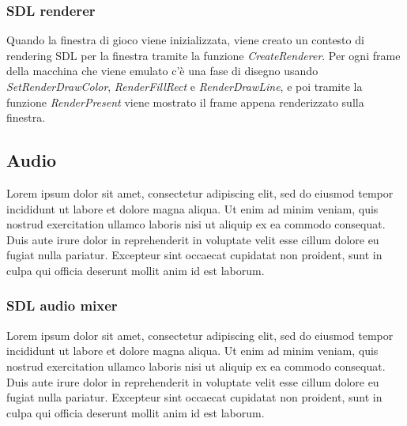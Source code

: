 \subsubsection{SDL renderer} \label{SDL_renderer}
Quando la finestra di gioco viene inizializzata, viene creato un contesto di rendering SDL per la finestra tramite la funzione \textit{CreateRenderer}. Per ogni frame della macchina che viene emulato c'è una fase di disegno usando \textit{SetRenderDrawColor}, \textit{RenderFillRect} e \textit{RenderDrawLine}, e poi tramite la funzione \textit{RenderPresent} viene mostrato il frame appena renderizzato sulla finestra.

\subsection{Audio}
Lorem ipsum dolor sit amet, consectetur adipiscing elit, sed do eiusmod tempor incididunt ut labore et dolore magna aliqua. Ut enim ad minim veniam, quis nostrud exercitation ullamco laboris nisi ut aliquip ex ea commodo consequat. Duis aute irure dolor in reprehenderit in voluptate velit esse cillum dolore eu fugiat nulla pariatur. Excepteur sint occaecat cupidatat non proident, sunt in culpa qui officia deserunt mollit anim id est laborum.

\subsubsection{SDL audio mixer}
Lorem ipsum dolor sit amet, consectetur adipiscing elit, sed do eiusmod tempor incididunt ut labore et dolore magna aliqua. Ut enim ad minim veniam, quis nostrud exercitation ullamco laboris nisi ut aliquip ex ea commodo consequat. Duis aute irure dolor in reprehenderit in voluptate velit esse cillum dolore eu fugiat nulla pariatur. Excepteur sint occaecat cupidatat non proident, sunt in culpa qui officia deserunt mollit anim id est laborum.

\cite{CPP_Primer}
\cite{Computer_Networking_and_the_Internet}
\cite{Ingegneria_del_software}
\cite{Understanding_the_Linux_Kernel}
\cite{Windows_Server_2012}